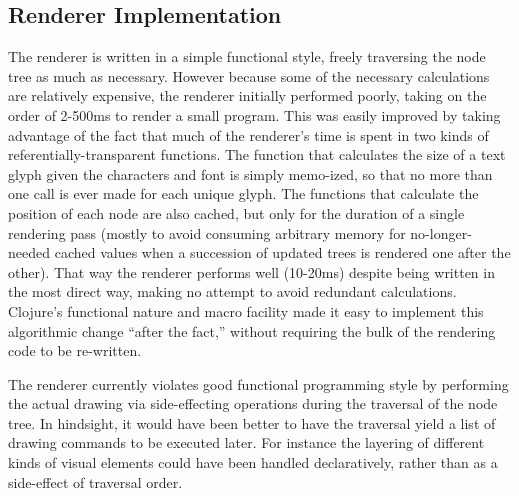 \subsection{Renderer Implementation}

The renderer is written in a simple functional style, freely traversing the node tree as much as necessary. However because some of the necessary calculations are relatively expensive, the renderer initially performed poorly, taking on the order of 2-500ms to render a small program. This was easily improved by taking advantage of the fact that much of the renderer's time is spent in two kinds of referentially-transparent functions. The function that calculates the size of a text glyph given the characters and font is simply memo-ized, so that no more than one call is ever made for each unique glyph. The functions that calculate the position of each node are also cached, but only for the duration of a single rendering pass (mostly to avoid consuming arbitrary memory for no-longer-needed cached values when a succession of updated trees is rendered one after the other). That way the renderer performs well (10-20ms) despite being written in the most direct way, making no attempt to avoid redundant calculations. Clojure's functional nature and macro facility made it easy to implement this algorithmic change ``after the fact,'' without requiring the bulk of the rendering code to be re-written.

The renderer currently violates good functional programming style by performing the actual drawing via side-effecting operations during the traversal of the node tree. In hindsight, it would have been better to have the traversal yield a list of drawing commands to be executed later. For instance the layering of different kinds of visual elements could have been handled declaratively, rather than as a side-effect of traversal order.



